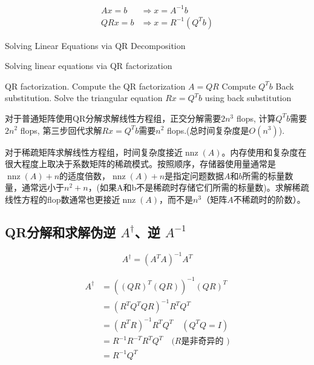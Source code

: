 \begin{corollary}
    

$$\begin{aligned}
   Ax = b &\Rightarrow x = A^{-1} b \\
QRx = b &\Rightarrow x = R^{-1} \left(Q^Tb\right)
\end{aligned}
$$
\end{corollary}

\begin{algorithm}[htbp]
    \caption[]{Solving Linear Equations via QR Decomposition}
    \caption{Solving linear equations via QR factorization}
    QR factorization. Compute the QR factorization $ A=Q R $\;
    Compute $ Q^{T} b $\;
    Back substitution. Solve the triangular equation $ R x=Q^{T} b $ using back substitution\;
\end{algorithm}

对于普通矩阵使用QR分解求解线性方程组，正交分解需要$2 n^3$ flops, 计算$Q^T b$需要$2n^2$ flops, 第三步回代求解$Rx = Q^Tb$需要$n^2$ flops.(总时间复杂度是$O(n^3)$). 

对于稀疏矩阵求解线性方程组，时间复杂度接近$\operatorname{nnz}(A)$。内存使用和复杂度在很大程度上取决于系数矩阵的稀疏模式。按照顺序，存储器使用量通常是$\operatorname{nnz}(A)+n$的适度倍数，$\operatorname{nnz}(A)+n$是指定问题数据$A$和$b$所需的标量数量，通常远小于$n^2+n$，(如果A和b不是稀疏时存储它们所需的标量数)。求解稀疏线性方程的flop数通常也更接近$\operatorname{nnz}(A)$，而不是$n^3$（矩阵$A$不稀疏时的阶数）。


\subsection{QR分解和求解伪逆 $A^{\dagger}$、逆 $A^{-1}$}

\begin{definition}
    $$A^{\dagger}=\left(A^{T} A\right)^{-1} A^{T}$$
\end{definition}

\begin{theorem}
    $$
\begin{aligned}
A^{\dagger}&=\left((Q R)^{T}(Q R)\right)^{-1}(Q R)^{T} \\
&=\left(R^{T} Q^{T} Q R\right)^{-1} R^{T} Q^{T} \\
&=\left(R^{T} R\right)^{-1} R^{T} Q^{T} \quad\left(Q^{T} Q=I\right) \\
&=R^{-1} R^{-T} R^{T} Q^{T} \quad(R{\text {是非奇异的 })} \\
 &={R^{-1} Q^{T}}
\end{aligned}
$$
\end{theorem}

